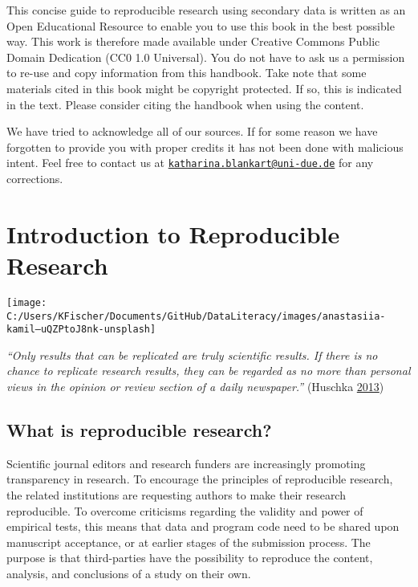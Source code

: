 \documentclass[
]{book}
\begin{document}
This concise guide to reproducible research using secondary data is
written as an Open Educational Resource to enable you to use this book
in the best possible way. This work is therefore made available under
Creative Commons Public Domain Dedication (CC0 1.0 Universal). You do
not have to ask us a permission to re-use and copy information from this
handbook. Take note that some materials cited in this book might be
copyright protected. If so, this is indicated in the text. Please
consider citing the handbook when using the content.

We have tried to acknowledge all of our sources. If for some reason we
have forgotten to provide you with proper credits it has not been done
with malicious intent. Feel free to contact us at
\href{mailto:katharina.blankart@uni-due.de}{\nolinkurl{katharina.blankart@uni-due.de}}
for any corrections.

\hypertarget{intro}{%
\chapter{Introduction to Reproducible Research}\label{intro}}

\begin{center}\texttt{[image: C:/Users/KFischer/Documents/GitHub/DataLiteracy/images/anastasiia-kamil--uQZPtoJ8nk-unsplash]} \end{center}

\emph{``Only results that can be replicated are truly scientific
results. If there is no chance to replicate research results, they can
be regarded as no more than personal views in the opinion or review
section of a daily newspaper.''} (Huschka
\protect\hyperlink{ref-huschka_why_2013}{2013})

\hypertarget{what-is-reproducible-research}{%
\section{What is reproducible
research?}\label{what-is-reproducible-research}}

Scientific journal editors and research funders are increasingly
promoting transparency in research. To encourage the principles of
reproducible research, the related institutions are requesting authors
to make their research reproducible. To overcome criticisms regarding
the validity and power of empirical tests, this means that data and
program code need to be shared upon manuscript acceptance, or at earlier
stages of the submission process. The purpose is that third-parties have
the possibility to reproduce the content, analysis, and conclusions of a
study on their own.
\end{document}
